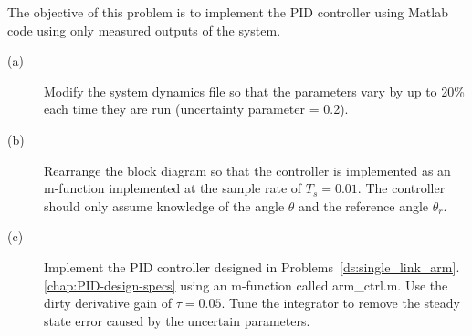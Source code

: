 

The objective of this problem is to implement the PID controller using Matlab code using only measured outputs of the system.
\begin{description}
\item[(a)]  Modify the system dynamics file so that the parameters vary by up to 20\% each time they are run (uncertainty parameter = 0.2).
\item[(b)]  Rearrange the block diagram so that the controller is implemented as an m-function implemented at the sample rate of $T_s=0.01$.  The controller should only assume knowledge of the angle $\theta$ and the reference angle $\theta_r$.
\item[(c)]  Implement the PID controller designed in Problems~\ref{ds:single_link_arm}.\ref{chap:PID-design-specs} using an m-function called arm\_ctrl.m.   Use the dirty derivative gain of $\tau=0.05$.  Tune the integrator to remove the steady state error caused by the uncertain parameters.
\end{description}
